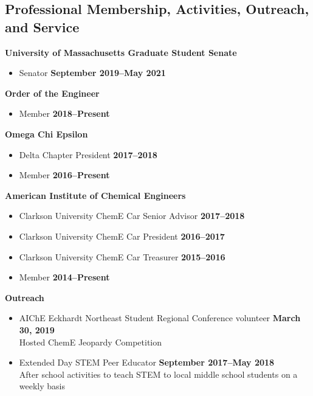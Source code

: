 \documentclass[margin,line]{res}
\begin{document}
\begin{resume}
	\section{\sc Professional Membership, Activities, Outreach, and Service}
	 {\bf University of Massachusetts Graduate Student Senate}
	\vspace*{.05in}
	\begin{itemize}
		\item[ ] Senator \hfill {\bf September 2019--May 2021}
	\end{itemize}
	{\bf Order of the Engineer}
	\vspace*{.05in}
	\begin{itemize}
		\item[ ] Member \hfill {\bf 2018--Present}
	\end{itemize}
	{\bf Omega Chi Epsilon}
	\vspace*{.05in}
	\begin{itemize}
		\item[ ] Delta Chapter President \hfill {\bf 2017--2018}
		\item[ ] Member \hfill {\bf 2016--Present}
	\end{itemize}
	{\bf American Institute of Chemical Engineers}
	\vspace*{.05in}
	\begin{itemize}
		\item[ ] Clarkson University ChemE Car Senior Advisor \hfill {\bf 2017--2018}
		\item[ ] Clarkson University ChemE Car President \hfill {\bf 2016--2017}
		\item[ ] Clarkson University ChemE Car Treasurer \hfill {\bf 2015--2016}
		\item[ ] Member \hfill {\bf 2014--Present}
	\end{itemize}

	{\bf Outreach}
	\vspace*{.05in}
	\begin{itemize}

		\item[] AIChE Eckhardt Northeast Student Regional Conference volunteer
		      \hfill {\bf March 30, 2019} \\
		      \hspace*{1em} Hosted ChemE Jeopardy Competition

		\item[] Extended Day STEM Peer Educator
		      \hfill {\bf September 2017--May 2018} \\
		      \hspace*{1em} After school activities to teach STEM to local middle
		      school students on a weekly basis


\end{itemize}
\end{resume}
\end{document}
